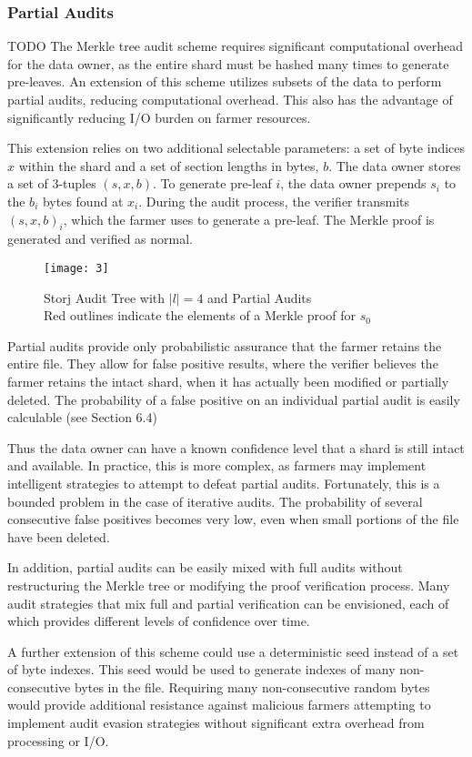 \documentclass[a4paper,10pt]{article}
\newcommand{\todo}[1]{{\color{red} TODO #1}}
\begin{document}
\subsubsection{Partial Audits}

\todo{
The Merkle tree audit scheme requires significant computational overhead for the
data owner, as the entire shard must be hashed many times to generate
pre-leaves. An extension of this scheme utilizes subsets of the data to perform
partial audits, reducing computational overhead. This also has the advantage of
significantly reducing I/O burden on farmer resources.

This extension relies on two additional selectable parameters: a set of byte
indices $ x $ within the shard and a set of section lengths in bytes, $ b $. The
data owner stores a set of 3-tuples $ (s, x, b) $. To generate pre-leaf $ i $,
the data owner prepends $ s_{i} $ to the $ b_{i} $ bytes found at $ x_{i} $.
During the audit process, the verifier transmits $ (s, x, b)_{i} $, which the
farmer uses to generate a pre-leaf. The Merkle proof is generated and verified
as normal.

\begin{figure}[hbt]
\centering
\texttt{[image: 3]}
\caption{Storj Audit Tree with $ |l| = 4 $ and Partial Audits\\Red outlines
indicate the elements of a Merkle proof for $ s_{0} $}
\end{figure}

Partial audits provide only probabilistic assurance that the farmer retains the
entire file. They allow for false positive results, where the verifier believes
the farmer retains the intact shard, when it has actually been modified or
partially deleted. The probability of a false positive on an individual partial
audit is easily calculable (see Section 6.4)

Thus the data owner can have a known confidence level that a shard is still
intact and available. In practice, this is more complex, as farmers may
implement intelligent strategies to attempt to defeat partial audits.
Fortunately, this is a bounded problem in the case of iterative audits. The
probability of several consecutive false positives becomes very low, even when
small portions of the file have been deleted.

In addition, partial audits can be easily mixed with full audits without
restructuring the Merkle tree or modifying the proof verification process. Many
audit strategies that mix full and partial verification can be envisioned, each
of which provides different levels of confidence over time.

A further extension of this scheme could use a deterministic seed instead of a
set of byte indexes. This seed would be used to generate indexes of many
non-consecutive bytes in the file. Requiring many non-consecutive random bytes
would provide additional resistance against malicious farmers attempting to
implement audit evasion strategies without significant extra overhead from
processing or I/O.
}
\end{document}
